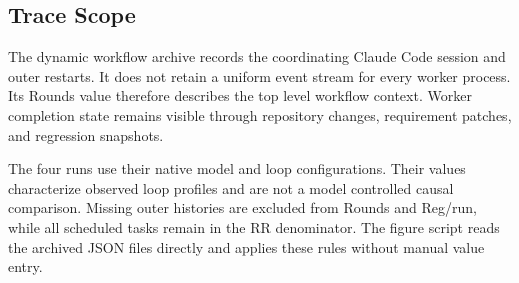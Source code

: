 \subsection{Trace Scope}\label{app:rq3-trace-scope}

The dynamic workflow archive records the coordinating Claude Code session and outer restarts. It does not retain a uniform event stream for every worker process. Its Rounds value therefore describes the top level workflow context. Worker completion state remains visible through repository changes, requirement patches, and regression snapshots.

The four runs use their native model and loop configurations. Their values characterize observed loop profiles and are not a model controlled causal comparison. Missing outer histories are excluded from Rounds and Reg/run, while all scheduled tasks remain in the RR denominator. The figure script reads the archived JSON files directly and applies these rules without manual value entry.
